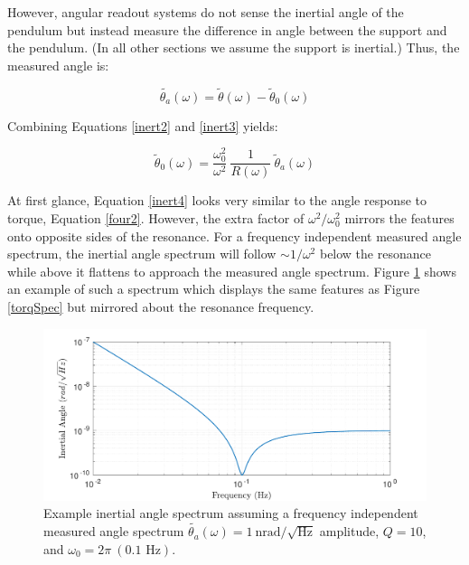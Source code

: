 \documentclass{book}
\begin{document}
However, angular readout systems do not sense the inertial angle of the pendulum but instead measure the difference in angle between the support and the pendulum. (In all other sections we assume the support is inertial.) Thus, the measured angle is:

\begin{equation}
\tilde{\theta_a}(\omega)=\tilde{\theta}(\omega)-\tilde{\theta}_0(\omega) \label{inert3}
\end{equation}

Combining Equations \ref{inert2} and \ref{inert3} yields:

\begin{equation}
\tilde{\theta}_0(\omega)=\frac{\omega_0^2}{\omega^2}\ \frac{1}{R(\omega)}\ \tilde{\theta}_a(\omega) \label{inert4}
\end{equation}

At first glance, Equation \ref{inert4} looks very similar to the angle response to torque, Equation \ref{four2}. However, the extra factor of $\omega^2/\omega_0^2$ mirrors the features onto opposite sides of the resonance. For a frequency independent measured angle spectrum, the inertial angle spectrum will follow $\sim1/\omega^2$ below the resonance while above it flattens to approach the measured angle spectrum. Figure \ref{inertSpec} shows an example of such a spectrum which displays the same features as Figure \ref{torqSpec} but mirrored about the resonance frequency.

\begin{figure}[!h]
\begin{centering}
\includegraphics[width=\textwidth]{InertialSpectrum.pdf}
\caption{Example inertial angle spectrum assuming a frequency independent measured angle spectrum $\tilde{\theta_a}(\omega) = 1\ \text{nrad}/\sqrt{\text{Hz}}$ amplitude, $Q=10$, and $\omega_0=2\pi\ (0.1 \text{ Hz})$.}\label{inertSpec}
\end{centering}
\end{figure}
\end{document}
